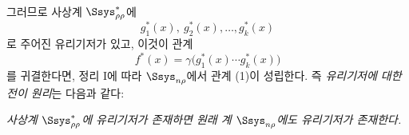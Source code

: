
그러므로 사상계 $\Ssys^*_{\rho\rho}$에
\[
g_1^*(x),\ g_2^*(x),\ldots,g_k^*(x)
\]
로 주어진 유리기저가 있고, 이것이 관계
\[
f^*(x)=\gamma\bigl(g_1^*(x)\cdots g_k^*(x)\bigr)
\]
를 귀결한다면, 정리 I에 따라 $\Ssys_{n\rho}$에서 관계 (1)이 성립한다. 즉 \emph{유리기저에 대한 전이 원리}는 다음과 같다:

\emph{사상계 $\Ssys^*_{\rho\rho}$에 유리기저가 존재하면 원래 계 $\Ssys_{n\rho}$에도 유리기저가 존재한다.}
